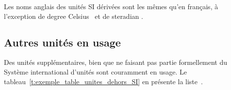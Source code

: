 \begin{table}
\end{table}

Les noms anglais des unités SI dérivées sont les mêmes qu'en français, à l'exception de \og degree Celsius \fg\ et de \og steradian \fg.


\subsection{Autres unités en usage}
\label{s:autres_unites}

Des unités supplémentaires, bien que ne faisant pas partie formellement du Système international d'unités sont couramment en usage. Le tableau~\ref{t:exemple_table_unites_dehors_SI} en présente la liste~\cite{BIP98}.

